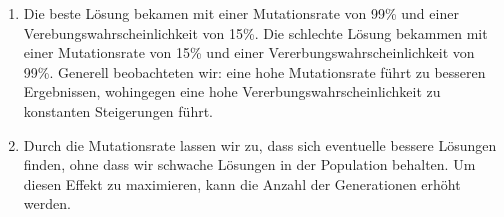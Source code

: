 \begin{enumerate}
	\item Die beste Lösung bekamen mit einer Mutationsrate von 99\% und einer Verebungswahrscheinlichkeit von 15\%. Die schlechte Lösung bekammen mit einer Mutationsrate von 15\% und einer Vererbungswahrscheinlichkeit von 99\%. Generell beobachteten wir: eine hohe Mutationsrate führt zu besseren Ergebnissen, wohingegen eine hohe Vererbungswahrscheinlichkeit zu konstanten Steigerungen führt.

	\item Durch die Mutationsrate lassen wir zu, dass sich eventuelle bessere Lösungen finden, ohne dass wir schwache Lösungen in der Population behalten. Um diesen Effekt zu maximieren, kann die Anzahl der Generationen erhöht werden.

\end{enumerate}
